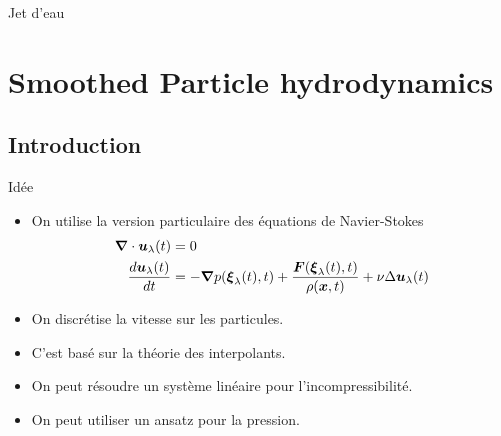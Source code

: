 \begin{frame}{Jet d'eau}
 
\end{frame}

\section{Smoothed Particle hydrodynamics}
\subsection{Introduction}
\begin{frame}[<+->]{Idée}
\begin{itemize}
\item On utilise la version particulaire des équations de Navier-Stokes
  \begin{align*}
{\boldsymbol {\nabla}} \cdot {\boldsymbol {u}}_{\lambda}(t)&=0\\
\frac{d {\boldsymbol {u}}_{\lambda}(t)}{d t}&=-{\boldsymbol {\nabla}} p({\boldsymbol {\xi}}_{\lambda}(t),t)+\frac{{\boldsymbol {F}}({\boldsymbol {\xi}}_{\lambda}(t),t)}{\rho({\boldsymbol {x}},t)}+\nu \Delta {\boldsymbol {u}}_{\lambda}(t)
 \end{align*}
 \item On discrétise la vitesse sur les particules.
 \item C'est basé sur la théorie des interpolants.
 \item On peut résoudre un système linéaire pour l'incompressibilité.
 \item On peut utiliser un ansatz pour la pression.
\end{itemize}
 
\end{frame}

